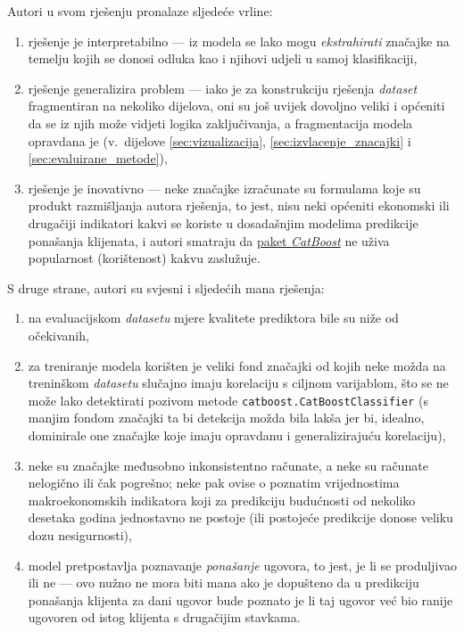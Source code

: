 \documentclass[paper = a4, fontsize = 11pt, DIV = 12, BCOR = 0pt, headings = standardclasses, numbers = endperiod]{scrartcl}
\begin{document}
	Autori u svom rješenju pronalaze sljedeće vrline:
	\begin{enumerate}
		\item rješenje je interpretabilno --- iz modela se lako mogu \emph{ekstrahirati} značajke na temelju kojih se donosi odluka kao i njihovi udjeli u samoj klasifikaciji,
		\item rješenje generalizira problem --- iako je za konstrukciju rješenja \emph{dataset} fragmentiran na nekoliko dijelova, oni su još uvijek dovoljno veliki i općeniti da se iz njih može vidjeti logika zaključivanja, a fragmentacija modela opravdana je (v.\ dijelove \ref{sec:vizualizacija}, \ref{sec:izvlacenje_znacajki} i \ref{sec:evaluirane_metode}),
		\item rješenje je inovativno --- neke značajke izračunate su formulama koje su produkt razmišljanja autora rješenja, to jest, nisu neki općeniti ekonomski ili drugačiji indikatori kakvi se koriste u dosadašnjim modelima predikcije ponašanja klijenata, i autori smatraju da \href{http://catboost.ai}{paket \emph{CatBoost}} ne uživa popularnost (korištenost) kakvu zaslužuje.
	\end{enumerate}

	\par

	S druge strane, autori su svjesni i sljedećih mana rješenja:
	\begin{enumerate}
		\item na evaluacijskom \emph{datasetu} mjere kvalitete prediktora bile su niže od očekivanih,
		\item za treniranje modela korišten je veliki fond značajki od kojih neke možda na treninškom \emph{datasetu} slučajno imaju korelaciju s ciljnom varijablom, što se ne može lako detektirati pozivom metode \lstinline[language = Python, style = lijepo]{catboost.CatBoostClassifier} (s manjim fondom značajki ta bi detekcija možda bila lakša jer bi, idealno, dominirale one značajke koje imaju opravdanu i generalizirajuću korelaciju),
		\item neke su značajke međusobno inkonsistentno računate, a neke su računate nelogično ili čak pogrešno; neke pak ovise o poznatim vrijednostima makroekonomskih indikatora koji za predikciju budućnosti od nekoliko desetaka godina jednostavno ne postoje (ili postojeće predikcije donose veliku dozu nesigurnosti),
		\item model pretpostavlja poznavanje \emph{ponašanje} ugovora, to jest, je li se produljivao ili ne --- ovo nužno ne mora biti mana ako je dopušteno da u predikciju ponašanja klijenta za dani ugovor bude poznato je li taj ugovor već bio ranije ugovoren od istog klijenta s drugačijim stavkama.
	\end{enumerate}
\end{document}
